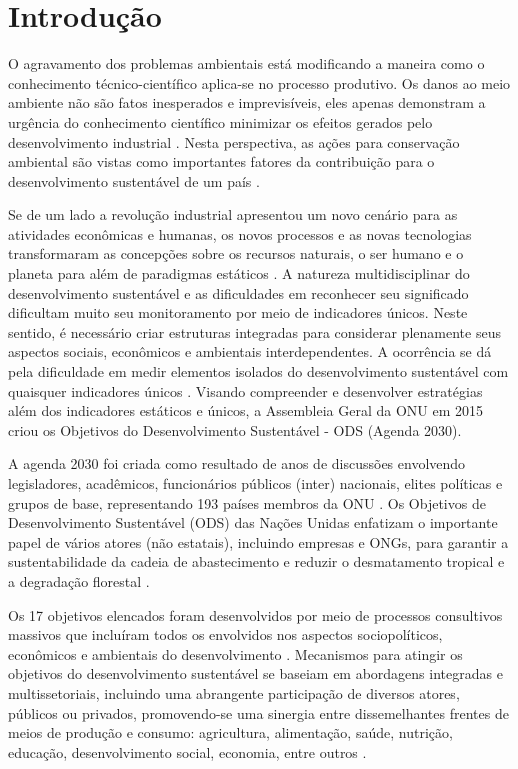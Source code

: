 \section{Introdução}

O agravamento dos problemas ambientais está modificando a maneira como o conhecimento técnico-científico aplica-se no processo produtivo. Os danos ao meio ambiente não são fatos inesperados e imprevisíveis, eles apenas demonstram a urgência do conhecimento científico minimizar os efeitos gerados pelo desenvolvimento industrial \cite{Adger2009NestedChange,Chen2021InvestigationGrowth}. Nesta perspectiva, as ações para conservação ambiental são vistas como importantes fatores da contribuição para o desenvolvimento sustentável de um país \cite{Lamichhane2021BenchmarkingApproach}. 

Se de um lado a revolução industrial apresentou um novo cenário para as atividades econômicas e humanas, os novos processos e as novas tecnologias transformaram as concepções sobre os recursos naturais, o ser humano e o planeta para além de paradigmas estáticos \cite{Cabigiosu2022SustainableVehicles}. A natureza multidisciplinar do desenvolvimento sustentável e as dificuldades em reconhecer seu significado dificultam muito seu monitoramento por meio de indicadores únicos. Neste sentido, é necessário criar estruturas integradas para considerar plenamente seus aspectos sociais, econômicos e ambientais interdependentes. A ocorrência se dá pela dificuldade em medir elementos isolados do desenvolvimento sustentável com quaisquer indicadores únicos \cite{Diaz-Sarachaga2018IsAgenda}. Visando compreender e desenvolver estratégias além dos indicadores estáticos e únicos, a Assembleia Geral da ONU em 2015 criou os Objetivos do Desenvolvimento Sustentável - ODS (Agenda 2030).

A agenda 2030 foi criada como resultado de anos de discussões envolvendo legisladores, acadêmicos, funcionários públicos (inter) nacionais, elites políticas e grupos de base, representando 193 países membros da ONU \cite{ONU2015}. Os Objetivos de Desenvolvimento Sustentável (ODS) das Nações Unidas enfatizam o importante papel de vários atores (não estatais), incluindo empresas e ONGs, para garantir a sustentabilidade da cadeia de abastecimento e reduzir o desmatamento tropical e a degradação florestal \cite{Delabre2020StrategiesGoals}.

Os 17 objetivos elencados foram desenvolvidos por meio de processos consultivos massivos que incluíram todos os envolvidos nos aspectos sociopolíticos, econômicos e ambientais do desenvolvimento \cite{Novovic2022CanSystem}. Mecanismos para atingir os objetivos do desenvolvimento sustentável se baseiam em abordagens integradas e multissetoriais, incluindo uma abrangente participação de diversos atores, públicos ou privados, promovendo-se uma sinergia entre dissemelhantes frentes de meios de produção e consumo: agricultura, alimentação, saúde, nutrição, educação, desenvolvimento social, economia, entre outros \cite{Silva2018g}. 

